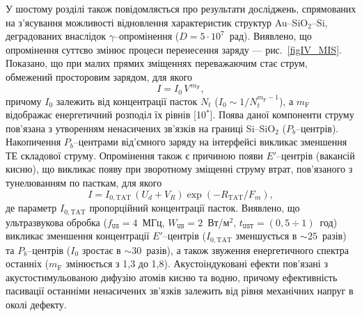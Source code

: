 У шостому розділі також повідомляється про результати досліджень, спрямованих на з'ясування можливості відновлення характеристик структур Au--SiO$_2$--Si,
деградованих внаслідок $\gamma$--опромінення ($D=5\cdot10^7$~рад).
Виявлено, що опромінення суттєво змінює процеси перенесення заряду --- рис.~\ref{figIV_MIS}.
Показано, що при малих прямих зміщеннях переважаючим стає струм, обмежений просторовим зарядом, для якого
\begin{equation}\label{eqVIsclc}
  I=I_0\,V^{\,m_\mathrm{F}},
\end{equation}
причому $I_0$ залежить від концентрації пасток $N_t$ ($I_0\sim 1/N_t^{m_\mathrm{F}-1}$),
а $m_\mathrm{F}$ відображає енергетичний розподіл їх рівнів
[10$^*$].
Поява даної компоненти струму пов'язана з утворенням ненасичених зв'язків на границі Si--SiO$_2$ ($P_b$--центрів).
Накопичення $P_b$--центрами від'ємного заряду на інтерфейсі викликає зменшення ТЕ складової струму.
Опромінення також є причиною появи $E'$--центрів (вакансій кисню), що
викликає появу при зворотному зміщенні струму втрат, пов'язаного з тунелюванням по пасткам, для якого
\begin{equation}\label{eqIVTAT}
  I=I_{0,\mathrm{TAT}}\,(U_d+V_R)\exp\left(-R_\mathrm{TAT}/F_m\right),
\end{equation}
де параметр $I_{0,\mathrm{TAT}}$ пропорційний концентрації пасток.
Виявлено, що
ультразвукова обробка
($f_\mathtt{US}=4$~МГц, $W_\mathtt{US}=2$~Вт/м$^2$, $t_\mathtt{UST}=(0,5\div1)$~год) викликає зменшення концентрації
$E'$--центрів ($I_{0,\mathrm{TAT}}$ зменшується в $\sim25$~разів) та  $P_b$--центрів ($I_0$ зростає в $\sim30$~разів),
а також звуження енергетичного спектра останніх ($m_\mathrm{F}$ змінюється з 1,3 до 1,8).
Акустоіндуковані ефекти пов'язані з акустостимульованою дифузію  атомів кисню та водню, причому ефективність пасивації останніми ненасичених зв'язків залежить
від рівня механічних напруг в околі дефекту.



